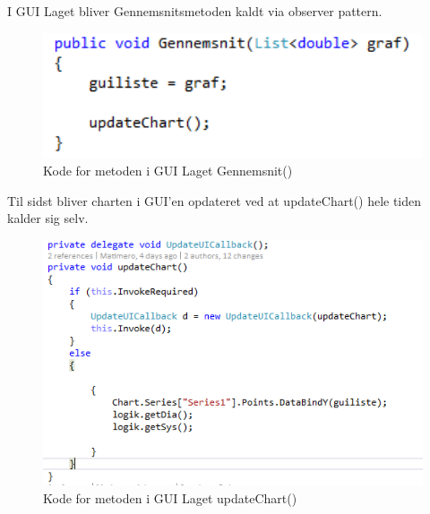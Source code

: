 I GUI Laget bliver Gennemsnitsmetoden kaldt via observer pattern.

\begin{figure}[H]
	\centering
	\includegraphics[width=1.0\textwidth]{FigurerProgram/GennemsnitGUI}
	\caption{Kode for metoden i GUI Laget Gennemsnit()}
\end{figure}

Til sidst bliver charten i GUI'en opdateret ved at updateChart() hele tiden kalder sig selv.

\begin{figure}[H]
	\centering
	\includegraphics[width=1.0\textwidth]{FigurerProgram/updateChart}
	\caption{Kode for metoden i GUI Laget updateChart()}
\end{figure}

